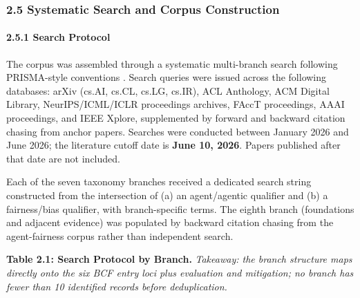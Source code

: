 \documentclass[10pt]{article}
\begin{document}
\subsubsection*{2.5 Systematic Search and Corpus Construction}

\paragraph*{2.5.1 Search Protocol}

The corpus was assembled through a systematic multi-branch search following PRISMA-style conventions \cite{moher2009preferred}. Search queries were issued across the following databases: arXiv (cs.AI, cs.CL, cs.LG, cs.IR), ACL Anthology, ACM Digital Library, NeurIPS/ICML/ICLR proceedings archives, FAccT proceedings, AAAI proceedings, and IEEE Xplore, supplemented by forward and backward citation chasing from anchor papers. Searches were conducted between January 2026 and June 2026; the literature cutoff date is \textbf{June 10, 2026}. Papers published after that date are not included.

Each of the seven taxonomy branches received a dedicated search string constructed from the intersection of (a) an agent/agentic qualifier and (b) a fairness/bias qualifier, with branch-specific terms. The eighth branch (foundations and adjacent evidence) was populated by backward citation chasing from the agent-fairness corpus rather than independent search.

\textbf{Table 2.1: Search Protocol by Branch.} \emph{Takeaway: the branch structure maps directly onto the six BCF entry loci plus evaluation and mitigation; no branch has fewer than 10 identified records before deduplication.}
\end{document}
